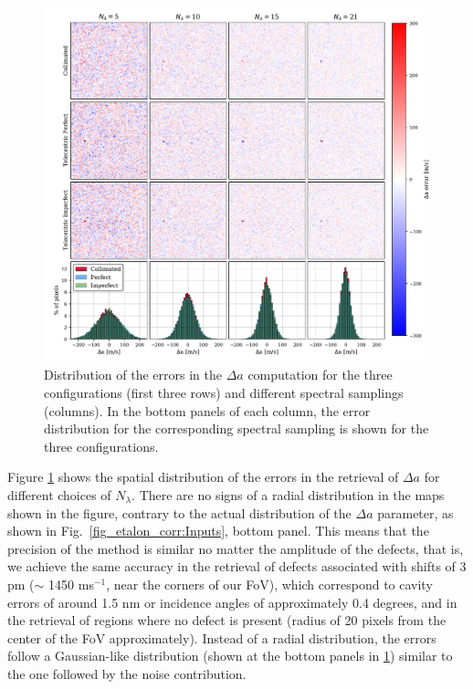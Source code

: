\begin{figure}
    \centering
    \includegraphics[width=\textwidth]{figures/EtalonPaper/Maps_Fov_Hist.pdf}
    \caption{Distribution of the errors in the $\Delta a$ computation for the three configurations (first three rows) and different spectral samplings (columns). In the bottom panels of each column, the error distribution for the corresponding spectral sampling is shown for the three configurations. }
   \label{fig_etalon_corr:FOV}
\end{figure}

Figure \ref{fig_etalon_corr:FOV} shows the spatial distribution of the errors in the retrieval of $\Delta a$ for different choices of $N_\lambda$. There are no signs of a radial distribution in the maps shown in the figure, contrary to the actual distribution of the $\Delta a$ parameter, as shown in Fig.~\ref{fig_etalon_corr:Inputs}, bottom panel. This means that the precision of the method is similar no matter the amplitude of the defects, that is, we achieve the same accuracy in the retrieval of defects associated with shifts of 3 pm ($\sim$ 1450 ms$^{-1}$, near the corners of our FoV), which correspond to cavity errors of around 1.5 nm or incidence angles of approximately 0.4 degrees, and in the retrieval of regions where no defect is present (radius of 20 pixels from the center of the FoV approximately). Instead of a radial distribution, the errors follow a Gaussian-like distribution (shown at the bottom panels in \ref{fig_etalon_corr:FOV}) similar to the one followed by the noise contribution.

